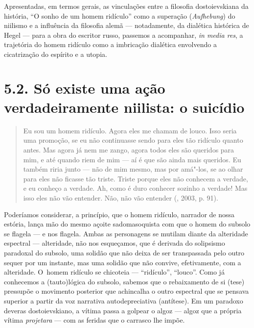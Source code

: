 Apresentadas, em termos gerais, as vinculações entre a filosofia
dostoievskiana da história, ``O sonho de um homem ridículo'' como a
superação (\emph{Aufhebung}) do niilismo e a influência da filosofia
alemã --- notadamente, da dialética histórica de Hegel --- para a obra do
escritor russo, passemos a acompanhar, \emph{in media res}, a trajetória
do homem ridículo como a imbricação dialética envolvendo a cicatrização
do espírito e a utopia.

\section{5.2. Só existe uma ação verdadeiramente niilista: o suicídio\protect\footnotemark}
  

\begin{quote}
Eu sou um homem ridículo. Agora eles me chamam de louco. Isso seria uma
promoção, se eu não continuasse sendo para eles tão ridículo quanto
antes. Mas agora já nem me zango, agora todos eles são queridos para
mim, e até quando riem de mim --- aí é que são ainda mais queridos. Eu
também riria junto --- não de mim mesmo, mas por amá"-los, se ao olhar
para eles não ficasse tão triste. Triste porque eles não conhecem a
verdade, e eu conheço a verdade. Ah, como é duro conhecer sozinho a
verdade! Mas isso eles não vão entender. Não, não vão entender
(, 2003, p. 91).
\end{quote}

Poderíamos considerar, a princípio, que o homem ridículo, narrador de
nossa estória, lança mão do mesmo açoite sadomasoquista com que o homem
do subsolo se flagela --- e nos flagela. Ambas as personagens se mutilam
diante da alteridade espectral --- alteridade, não nos esqueçamos, que é
derivada do solipsismo paradoxal do subsolo, uma solidão que não deixa
de ser transpassada pelo outro sequer por um instante, mas uma solidão
que não convive, efetivamente, com a alteridade. O~homem ridículo se
chicoteia --- ``ridículo'', ``louco''. Como já conhecemos a (tauto)lógica
do subsolo, sabemos que o rebaixamento de si (tese) pressupõe o
movimento posterior que achincalha o outro espectral que se pensava
superior a partir da voz narrativa autodepreciativa (antítese). Em um
paradoxo deveras dostoievskiano, a vítima passa a golpear o algoz ---
algoz que a própria vítima \emph{projetara} --- com as feridas que o
carrasco lhe impõe.

